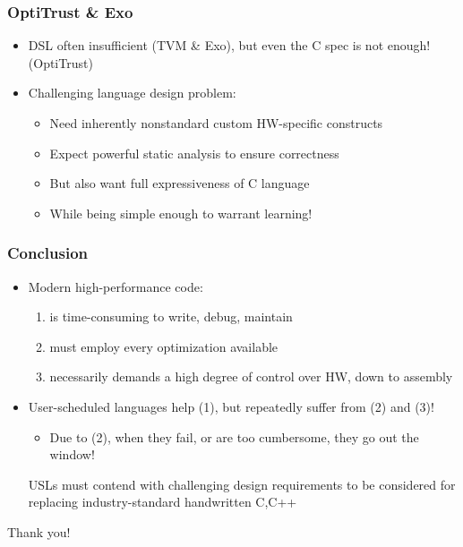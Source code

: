 \documentclass[aspectratio=169]{beamer}
\begin{document}
\begin{frame}
    \frametitle{OptiTrust \& Exo}

    \begin{itemize}
    \item DSL often insufficient (TVM \& Exo), but even the C spec is not enough! (OptiTrust)
    \item Challenging language design problem:
    \begin{itemize}
    \item Need inherently nonstandard custom HW-specific constructs
    \item Expect powerful static analysis to ensure correctness
    \item But also want full expressiveness of C language
    \item While being simple enough to warrant learning!
    \end{itemize}
\end{itemize}
\end{frame}

\begin{frame}
    \frametitle{Conclusion}
    \begin{itemize}
    \item Modern high-performance code:
    \begin{enumerate} 
        \item is time-consuming to write, debug, maintain
        \item must employ every optimization available
        \item necessarily demands a high degree of control over HW, down to assembly
    \end{enumerate}
    \item User-scheduled languages help (1), but repeatedly suffer from (2) and (3)!
    \begin{itemize}
        \item Due to (2), when they fail, or are too cumbersome, they go out the window! \pause
    \end{itemize}
    \begin{block}
        
        USLs must contend with challenging design requirements to be considered for replacing industry-standard handwritten C,C++    
    
    \end{block}
    
    \end{itemize}
\end{frame}

\begin{frame}[plain,c]    
    \begin{center}
    \Huge Thank you!
    \end{center}
\end{frame}
\end{document}
